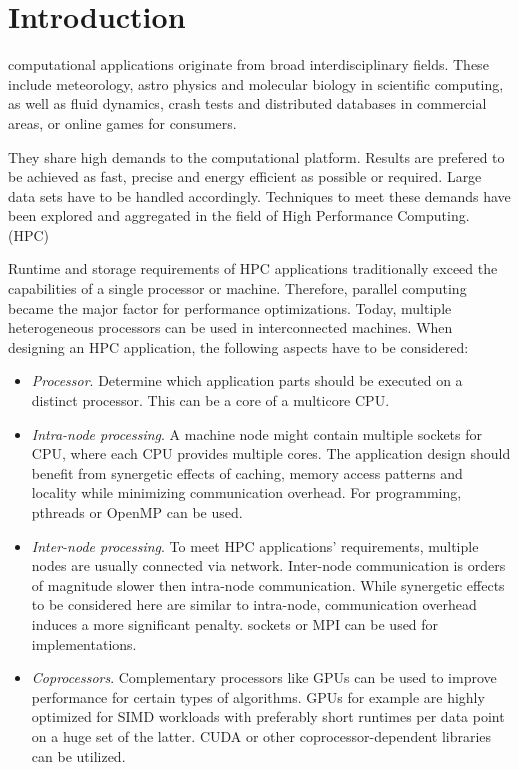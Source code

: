 \section{Introduction}

 computational applications originate from broad interdisciplinary fields. These include meteorology, astro physics and molecular biology in scientific computing, as well as fluid dynamics, crash tests and distributed databases in commercial areas, or online games for consumers.

They share high demands to the computational platform. Results are prefered to be achieved as fast, precise and energy efficient as possible or required. Large data sets have to be handled accordingly. Techniques to meet these demands have been explored and aggregated in the field of High Performance Computing. (HPC)

Runtime and storage requirements of HPC applications traditionally exceed the capabilities of a single processor or machine. Therefore, parallel computing became the major factor for performance optimizations. Today, multiple heterogeneous processors can be used in interconnected machines. When designing an HPC application, the following aspects have to be considered:

\begin{itemize}

\item \textit{Processor}. Determine which application parts should be executed on a distinct processor. This can be a core of a multicore CPU.

\item \textit{Intra-node processing}. A machine node might contain multiple sockets for CPU, where each CPU provides multiple cores. The application design should benefit from synergetic effects of caching, memory access patterns and locality while minimizing communication overhead. For programming, pthreads or OpenMP can be used.

\item \textit{Inter-node processing}. To meet HPC applications' requirements, multiple nodes are usually connected via network. Inter-node communication is orders of magnitude slower then intra-node communication. While synergetic effects to be considered here are similar to intra-node, communication overhead induces a more significant penalty. sockets or MPI can be used for implementations.

\item \textit{Coprocessors}. Complementary processors like GPUs can be used to improve performance for certain types of algorithms. GPUs for example are highly optimized for SIMD workloads with preferably short runtimes per data point on a huge set of the latter. CUDA or other coprocessor-dependent libraries can be utilized.

\end{itemize}

